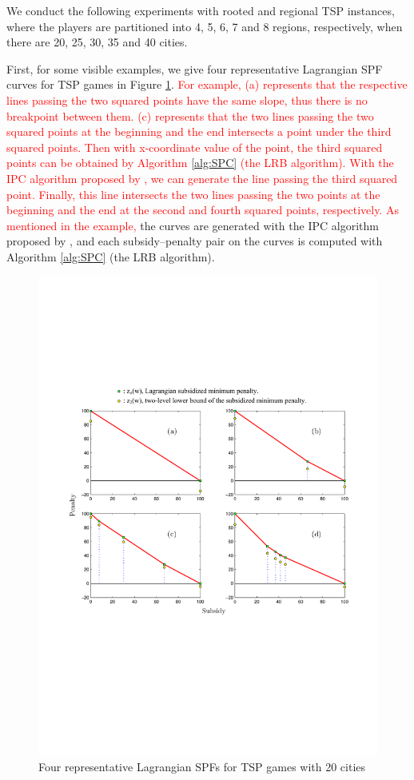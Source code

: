 \documentclass[authoryear,review,12pt]{elsarticle}
\begin{document}
We conduct the following experiments with rooted and regional TSP instances, where the players are partitioned into 4, 5, 6, 7 and 8 regions, respectively, when there are 20, 25, 30, 35 and 40 cities.

First, for some visible examples, we give four representative Lagrangian SPF curves for TSP games in Figure \ref{figure:20partitioned}.
\textcolor{red}{For example, (a) represents that the respective lines passing the two squared points have the same slope, thus there is no breakpoint between them. (c) represents that the two lines passing the two squared points at the beginning and the end intersects a point under the third squared points. Then with x-coordinate value of the point, the third squared points can be obtained by Algorithm \ref{alg:SPC} (the LRB algorithm). With the IPC algorithm proposed by \cite{leastcore2018}, we can generate the line passing the third squared point. Finally, this line
intersects the two lines passing the two points at the beginning and the end at the second and fourth squared points, respectively.
As mentioned in the example,} the curves are generated with the IPC algorithm proposed by \cite{leastcore2018}, and each subsidy--penalty pair on the curves is computed with Algorithm \ref{alg:SPC} (the LRB algorithm).


\begin{figure}[H]
\centering
\includegraphics[width=1\textwidth]{1.pdf}
\centering
\caption{\label{figure:20partitioned}Four representative Lagrangian SPFs for TSP games with 20 cities}
\end{figure}
\end{document}
